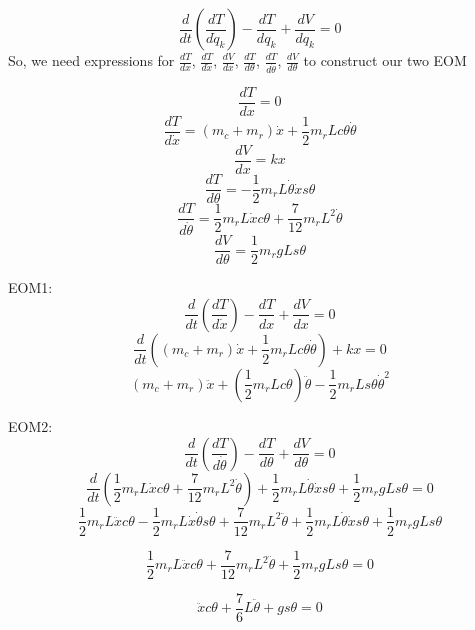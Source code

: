 \documentclass[]{article}
\begin{document}
$$
\frac{d}{dt} (\frac{dT}{d\dot{q}_k}) - \frac{dT}{dq_k} + \frac{dV}{dq_k} = 0
$$
So, we need expressions for $\frac{dT}{dx}$, $\frac{dT}{d \dot{x}}$, $\frac{dV}{dx}$, $\frac{dT}{d\theta}$, $\frac{dT}{d \dot{\theta}}$, $\frac{dV}{d\theta}$ to construct our two EOM

$$\frac{dT}{dx} = 0$$
$$\frac{dT}{d \dot{x}} = (m_c+  m_r)\dot{x} +\frac{1}{2} m_r Lc\theta \dot{\theta}$$
$$\frac{dV}{dx} = kx$$
$$\frac{dT}{d\theta}  =-\frac{1}{2} m_r L \dot{\theta} \dot{x} s\theta$$
$$\frac{dT}{d \dot{\theta}}  =\frac{1}{2} m_r L \dot{x} c\theta + \frac{7}{12} m_r L^2 \dot{\theta}$$
$$\frac{dV}{d\theta}  =\frac{1}{2} m_r g L s\theta$$

\newpage

EOM1:
$$\frac{d}{dt} (\frac{dT}{d\dot{x}}) - \frac{dT}{dx} + \frac{dV}{dx} = 0$$
$$\frac{d}{dt} ((m_c+  m_r)\dot{x} +\frac{1}{2} m_r Lc\theta \dot{\theta}) + kx = 0$$
$$\boxed{(m_c+  m_r)\ddot{x} +(\frac{1}{2} m_r Lc\theta) \ddot{\theta} - \frac{1}{2} m_r Ls\theta \dot{\theta}^2}$$

EOM2:
$$\frac{d}{dt} (\frac{dT}{d\dot{\theta}}) - \frac{dT}{d\theta} + \frac{dV}{d\theta} = 0$$
$$\frac{d}{dt} (\frac{1}{2} m_r L \dot{x} c\theta + \frac{7}{12} m_r L^2 \dot{\theta})+\frac{1}{2} m_r L \dot{\theta} \dot{x} s\theta + \frac{1}{2} m_r g L s\theta= 0$$
$$\frac{1}{2} m_r L \ddot{x} c\theta - \frac{1}{2} m_r L \dot{x} \dot{\theta} s\theta + \frac{7}{12} m_r L^2 \ddot{\theta} +\frac{1}{2} m_r L \dot{\theta} \dot{x} s\theta + \frac{1}{2} m_r g L s\theta $$

$$
\frac{1}{2} m_r L \ddot{x} c\theta + \frac{7}{12} m_r L^2 \ddot{\theta} + \frac{1}{2} m_r g L s\theta  = 0
$$

$$
\boxed{\ddot{x} c\theta + \frac{7}{6} L \ddot{\theta} +  g s\theta  = 0}
$$
\end{document}
